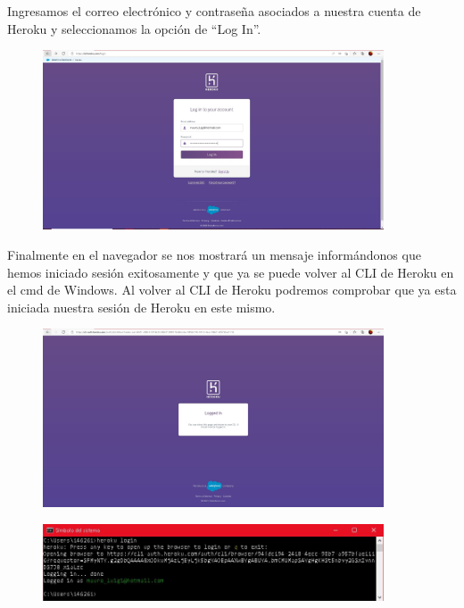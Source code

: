 \documentclass[10pt,a4paper]{article} %
\begin{document}
\begin{enumerate}
{			\item Ingresamos el correo electr{\'o}nico y contrase{\~n}a asociados a nuestra cuenta de Heroku y seleccionamos la opci{\'o}n de ``Log In''.
			\begin{figure}[H]
				\includegraphics[width=0.9\textwidth]{resultado5.jpg}
				\centering
				\label{img:login_paso3}
			\end{figure}
			\item Finalmente en el navegador se nos mostrar{\'a} un mensaje inform{\'a}ndonos que hemos iniciado sesi{\'o}n exitosamente y que ya se puede volver al CLI de Heroku en el cmd de Windows. Al volver al CLI de Heroku podremos comprobar que ya esta iniciada nuestra sesi{\'o}n de Heroku en este mismo.
			\begin{figure}[H]
				\includegraphics[width=0.9\textwidth]{resultado6.jpg}
				\centering
				\label{img:login_paso4.1}
				
				
				\vspace{0.5cm}
				\includegraphics[width=0.9\textwidth]{resultado7.jpg}
				\centering
				\label{img:login_paso4.2}
			\end{figure}
		}
	\end{enumerate}
	
\end{document}

